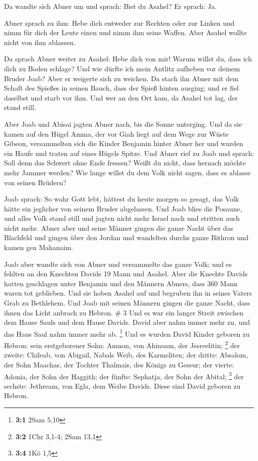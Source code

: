  Da wandte sich Abner um und sprach: Bist du Asahel? Er
sprach: Ja.

 Abner sprach zu ihm: Hebe dich entweder zur Rechten oder
zur Linken und nimm für dich der Leute einen und nimm ihm seine Waffen.
Aber Asahel wollte nicht von ihm ablassen.

 Da sprach Abner weiter zu Asahel: Hebe dich von mir!
Warum willst du, dass ich dich zu Boden schlage? Und wie dürfte ich mein
Antlitz aufheben vor deinem Bruder Joab?  Aber er
weigerte sich zu weichen. Da stach ihn Abner mit dem Schaft des Spießes
in seinen Bauch, dass der Spieß hinten ausging; und er fiel daselbst und
starb vor ihm. Und wer an den Ort kam, da Asahel tot lag, der stand
still.

 Aber Joab und Abisai jagten Abner nach, bis die Sonne
unterging. Und da sie kamen auf den Hügel Amma, der vor Giah liegt auf
dem Wege zur Wüste Gibeon,  versammelten sich die Kinder
Benjamin hinter Abner her und wurden ein Haufe und traten auf eines
Hügels Spitze.  Und Abner rief zu Joab und sprach: Soll
denn das Schwert ohne Ende fressen? Weißt du nicht, dass hernach möchte
mehr Jammer werden? Wie lange willst du dem Volk nicht sagen, dass es
ablasse von seinen Brüdern?

 Joab sprach: So wahr Gott lebt, hättest du heute morgen
so gesagt, das Volk hätte ein jeglicher von seinem Bruder abgelassen.
 Und Joab blies die Posaune, und alles Volk stand still
und jagten nicht mehr Israel nach und stritten auch nicht mehr.
 Abner aber und seine Männer gingen die ganze Nacht über
das Blachfeld und gingen über den Jordan und wandelten durchs ganze
Bithron und kamen gen Mahanaim.

 Joab aber wandte sich von Abner und versammelte das
ganze Volk; und es fehlten an den Knechten Davids 19 Mann und Asahel.
 Aber die Knechte Davids hatten geschlagen unter Benjamin
und den Männern Abners, dass 360 Mann waren tot geblieben.
 Und sie hoben Asahel auf und begruben ihn in seines
Vaters Grab zu Bethlehem. Und Joab mit seinen Männern gingen die ganze
Nacht, dass ihnen das Licht anbrach zu Hebron. \# 3  Und
es war ein langer Streit zwischen dem Hause Sauls und dem Hause Davids.
David aber nahm immer mehr zu, und das Haus Saul nahm immer mehr ab.
\footnote{\textbf{3:1} 2Sam 5,10}  Und es wurden David
Kinder geboren zu Hebron: sein erstgeborener Sohn: Amnon, von Ahinoam,
der Jesreelitin; \footnote{\textbf{3:2} 1Chr 3,1-4; 2Sam 13,1}
 der zweite: Chileab, von Abigail, Nabals Weib, des
Karmeliten; der dritte: Absalom, der Sohn Maachas, der Tochter Thalmais,
des Königs zu Gessur;  der vierte: Adonia, der Sohn der
Haggith; der fünfte: Sephatja, der Sohn der Abital; \footnote{\textbf{3:4}
  1Kö 1,5}  der sechste: Jethream, von Egla, dem Weibe
Davids. Diese sind David geboren zu Hebron.

